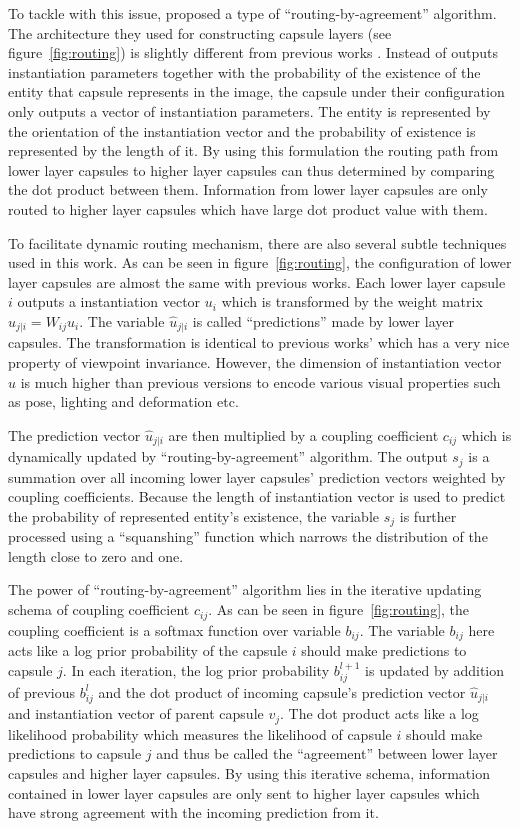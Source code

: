 \documentclass{article} \usepackage{tabularx}
\renewcommand{\citename}{\citet} \renewcommand{\cite}{\citep}
\begin{document}
To tackle with this issue, \citename{capsule} proposed a type of
``routing-by-agreement'' algorithm. The architecture they used
for constructing capsule layers (see figure~\ref{fig:routing}) is
slightly different from previous works
\cite{zemel1990traffic,hinton2011transforming}. Instead of
outputs instantiation parameters together with the probability of
the existence of the entity that capsule represents in the image,
the capsule under their configuration only outputs a vector of
instantiation parameters. The entity is represented by the
orientation of the instantiation vector and the probability of
existence is represented by the length of it. By using this
formulation the routing path from lower layer capsules to higher
layer capsules can thus determined by comparing the dot product
between them. Information from lower layer capsules are only
routed to higher layer capsules which have large dot product
value with them.

To facilitate dynamic routing mechanism, there are also several
subtle techniques used in this work. As can be seen in
figure~\ref{fig:routing}, the configuration of lower layer
capsules are almost the same with previous works. Each lower
layer capsule $i$ outputs a instantiation vector $u_i$ which is
transformed by the weight matrix $\hat{u}_{j|i}=W_{ij}u_i$. The
variable $\hat{u}_{j|i}$ is called ``predictions'' made by lower
layer capsules. The transformation is identical to previous
works' which has a very nice property of viewpoint invariance.
However, the dimension of instantiation vector $u$ is much higher
than previous versions to encode various visual properties such
as pose, lighting and deformation etc.

The prediction vector $\hat{u}_{j|i}$ are then multiplied by a
coupling coefficient $c_{ij}$ which is dynamically updated by
``routing-by-agreement'' algorithm. The output $s_j$ is a
summation over all incoming lower layer capsules' prediction
vectors weighted by coupling coefficients. Because the length of
instantiation vector is used to predict the probability of
represented entity's existence, the variable $s_j$ is further
processed using a ``squanshing'' function which narrows the
distribution of the length close to zero and one.

The power of ``routing-by-agreement'' algorithm lies in the
iterative updating schema of coupling coefficient $c_{ij}$. As
can be seen in figure~\ref{fig:routing}, the coupling coefficient
is a softmax function over variable $b_{ij}$. The variable
$b_{ij}$ here acts like a log prior probability of the capsule
$i$ should make predictions to capsule $j$. In each iteration,
the log prior probability $b^{l+1}_{ij}$ is updated by addition
of previous $b^l_{ij}$ and the dot product of incoming capsule's
prediction vector $\hat{u}_{j|i}$ and instantiation vector of
parent capsule $v_j$. The dot product acts like a log likelihood
probability which measures the likelihood of capsule $i$ should
make predictions to capsule $j$ and thus be called the
``agreement'' between lower layer capsules and higher layer
capsules. By using this iterative schema, information contained
in lower layer capsules are only sent to higher layer capsules
which have strong agreement with the incoming prediction from it.
\end{document}
